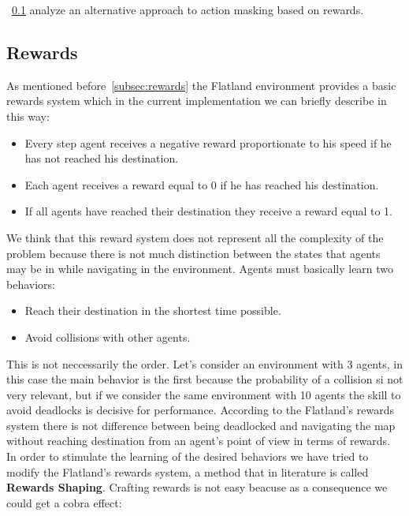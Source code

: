 \documentclass[11pt, a4paper, hidelinks]{report}
\begin{document}
~\ref{subsec:rewards2} analyze an alternative approach to action masking based on rewards.

\subsection{Rewards}\label{subsec:rewards2}

As mentioned before~\ref{subsec:rewards} the Flatland environment provides a basic rewards system which in the current implementation we can briefly describe in this way:
\begin{itemize}
	\item Every step agent receives a negative reward proportionate to his speed if he has not reached his destination.
	\item Each agent receives a reward equal to 0 if he has reached his destination.
	\item If all agents have reached their destination they receive a reward equal to 1.
\end{itemize}
We think that this reward system does not represent all the complexity of the problem because there is not much distinction between the states that agents may be in while navigating in the environment.
Agents must basically learn two behaviors:
\begin{itemize}
	\item Reach their destination in the shortest time possible.
	\item Avoid collisions with other agents.
\end{itemize}
This is not neccessarily the order.
Let's consider an environment with 3 agents, in this case the main behavior is the first because the probability of a collision si not very relevant, but if we consider the same environment with 10 agents the skill to avoid deadlocks is decisive for performance.
According to the Flatland's rewards system there is not difference between being deadlocked and navigating the map without reaching destination from an agent's point of view in terms of rewards.
In order to stimulate the learning of the desired behaviors we have tried to modify the Flatland's rewards system, a method that in literature is called \textbf{Rewards Shaping}.
Crafting rewards is not easy beacuse as a consequence we could get a cobra effect:
\end{document}
